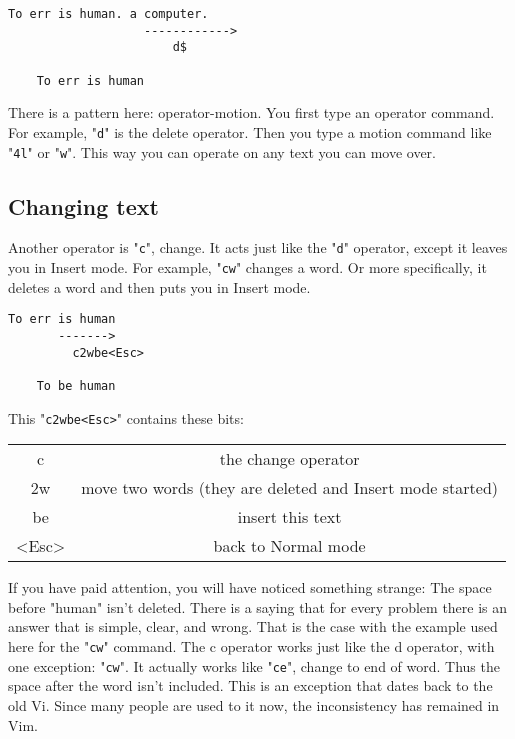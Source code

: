 \begin{Verbatim}[samepage=true]
    To err is human. a computer. 
                   ------------>
                       d$

    To err is human 
\end{Verbatim}

There is a pattern here: operator-motion.
You first type an operator command.
For example, "\verb!d!" is the delete operator.
Then you type a motion command like "\verb!4l!" or "\verb!w!".
This way you can operate on any text you can move over.

\subsection{Changing text}

Another operator is "\verb!c!", change.
It acts just like the "\verb!d!" operator, except it leaves you in Insert mode.
For example, "\verb!cw!" changes a word.
Or more specifically, it deletes a word and then puts you in Insert mode.

\begin{Verbatim}[samepage=true]
    To err is human 
       ------->
         c2wbe<Esc>

    To be human 
\end{Verbatim}

This "\verb!c2wbe<Esc>!" contains these bits:
\begin{center}
\begin{tabular}{c c}
				c & the change operator\\
				2w & move two words (they are deleted and Insert mode started)\\
				be & insert this text\\
				<Esc> & back to Normal mode\\
\end{tabular}
\end{center}

If you have paid attention, you will have noticed something strange: The space before "human" isn't deleted.
There is a saying that for every problem there is an answer that is simple, clear, and wrong.
That is the case with the example used here for the "\verb!cw!" command.
The c operator works just like the d operator, with one exception: "\verb!cw!".
It actually works like "\verb!ce!", change to end of word.
Thus the space after the word isn't included.
This is an exception that dates back to the old Vi.
Since many people are used to it now, the inconsistency has remained in Vim.

